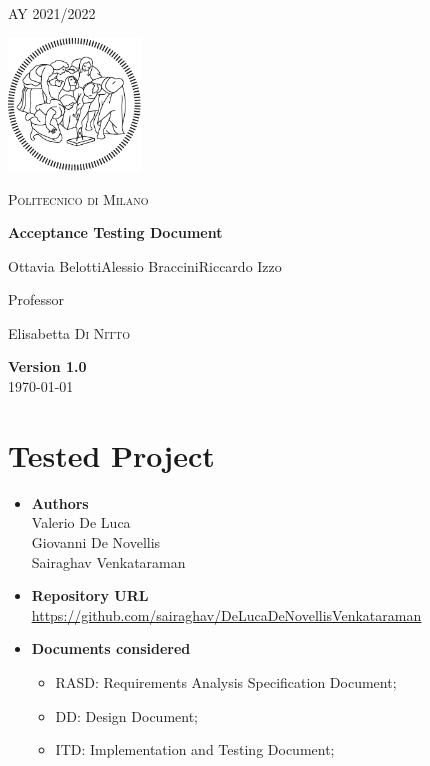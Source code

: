 \documentclass[table, 12pt]{article}
\begin{document}
\begin{titlepage}
    \centering
    {\scshape\large AY 2021/2022 \par}
    \vfill
    \includegraphics[width=100pt]{assets/logo-polimi-new}\par\vspace{1cm}
    {\scshape\LARGE Politecnico di Milano \par}
    \vspace{1.5cm}
    {\huge\bfseries Acceptance Testing Document \par}
    \vspace{2cm}
    {\Large {Ottavia Belotti\quad Alessio Braccini\quad Riccardo Izzo}\par}
    \vfill
    {\large Professor\par
        Elisabetta \textsc{Di Nitto}}
    \vfill
    {\large \textbf{Version 1.0} \\ \today \par}
\end{titlepage}
\thispagestyle{plain}
\mbox{}
\newpage
{}
\tableofcontents
\newpage
{}

\section{Tested Project}
\begin{itemize}
    \item \textbf{Authors}\\Valerio De Luca\\Giovanni De Novellis\\Sairaghav Venkataraman
    \item \textbf{Repository URL}\\ \underline{\url{https://github.com/sairaghav/DeLucaDeNovellisVenkataraman}}
    \item \textbf{Documents considered}\begin{itemize}
              \item RASD: Requirements Analysis Specification Document;
              \item DD: Design Document;
              \item ITD: Implementation and Testing Document;
          \end{itemize}
\end{itemize}
\newpage
\end{document}
